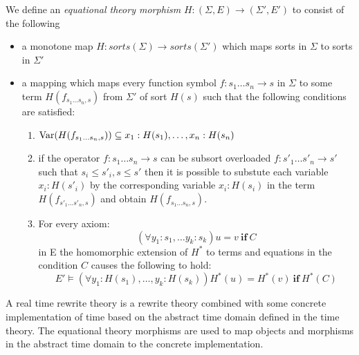 \begin{mydef}
 We define an \emph{equational theory morphism} $H: (\Sigma,E) \to (\Sigma', E')$ to consist of the following
\begin{itemize}
\item a monotone map $H:sorts(\Sigma) \to sorts(\Sigma')$ which maps  sorts in $\Sigma$  to sorts in $\Sigma'$

\item a mapping which maps every function symbol $f : s_1 \ldots s_n \to s$ in $\Sigma$ to some term $H(f_{s_1 \ldots s_n, s})$ from $\Sigma'$ of sort $H(s)$ such that the following conditions are satisfied:
\begin{enumerate}

\item  $\mathrm{Var}(H(f_{s_1 \ldots s_n, s})) \subseteq {x_1:H(s_1), \ldots, x_n:H(s_n)}$

\item if the operator $f: s_1 \ldots s_n \to s$ can be subsort overloaded $f: s'_1 \ldots s'_n \to s'$ such that $s_i \leq s'_i, s\leq s'$ then it is possible to substute each variable $x_i:H(s'_i)$ by the corresponding variable $x_i:H(s_i)$ in the term $H(f_{s'_1 \ldots s'_n, s})$ and obtain $H(f_{s_1 \ldots s_n, s})$.

\item For every axiom: $$(\forall y_1:s_1, \ldots y_k : s_k) u = v \ \textbf{if} \ C$$ in E the homomorphic extension of $H^*$ to terms and equations in the condition $C$ causes the following to hold:
   $$E' \models (\forall y_1 : H(s_1), \ldots, y_k : H(s_k)) H^*(u) = H^*(v) \ \textbf{if} \ H^*(C)$$

\end{enumerate}

\end{itemize}

\end{mydef}
\medskip

A real time rewrite theory is a rewrite theory combined with some concrete implementation of time based on the abstract time domain defined in the time theory. The equational theory morphisms are used to map objects and morphisms in the abstract time domain to the concrete implementation.

